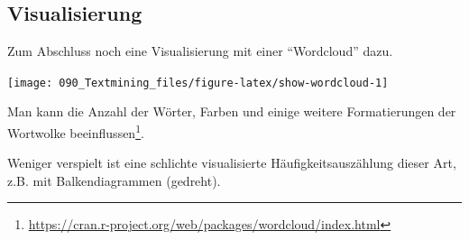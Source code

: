 \documentclass[12pt,ngerman,]{book}
\makeatletter
\newenvironment{Shaded}{\begin{snugshade}}{\end{snugshade}}
\newcommand{\KeywordTok}[1]{\textcolor[rgb]{0.13,0.29,0.53}{\textbf{#1}}}
\newcommand{\DataTypeTok}[1]{\textcolor[rgb]{0.13,0.29,0.53}{#1}}
\newcommand{\DecValTok}[1]{\textcolor[rgb]{0.00,0.00,0.81}{#1}}
\newcommand{\StringTok}[1]{\textcolor[rgb]{0.31,0.60,0.02}{#1}}
\newcommand{\OperatorTok}[1]{\textcolor[rgb]{0.81,0.36,0.00}{\textbf{#1}}}
\newcommand{\NormalTok}[1]{#1}
\let\rmarkdownfootnote\footnote%
\def\footnote{\protect\rmarkdownfootnote}
\newenvironment{kframe}{%
\medskip{}
\setlength{\fboxsep}{.8em}
 \def\at@end@of@kframe{}%
 \ifinner\ifhmode%
  \def\at@end@of@kframe{\end{minipage}}%
  \begin{minipage}{\columnwidth}%
 \fi\fi%
 \def\FrameCommand##1{\hskip\@totalleftmargin \hskip-\fboxsep
 \colorbox{shadecolor}{##1}\hskip-\fboxsep
     \hskip-\linewidth \hskip-\@totalleftmargin \hskip\columnwidth}%
 \MakeFramed {\advance\hsize-\width
   \@totalleftmargin\z@ \linewidth\hsize
   \@setminipage}}%
 {\par\unskip\endMakeFramed%
 \at@end@of@kframe}
\renewenvironment{Shaded}{\begin{kframe}}{\end{kframe}}
\theoremstyle{definition}
\theoremstyle{definition}
\theoremstyle{remark}
\makeatother
\begin{document}
\subsection{Visualisierung}\label{visualisierung}

Zum Abschluss noch eine Visualisierung mit einer ``Wordcloud'' dazu.

\begin{Shaded}
\end{Shaded}

\begin{Shaded}
\end{Shaded}

\begin{center}\texttt{[image: 090\_Textmining\_files/figure-latex/show-wordcloud-1]} \end{center}

Man kann die Anzahl der Wörter, Farben und einige weitere Formatierungen
der Wortwolke beeinflussen\footnote{\url{https://cran.r-project.org/web/packages/wordcloud/index.html}}.

Weniger verspielt ist eine schlichte visualisierte Häufigkeitsauszählung
dieser Art, z.B. mit Balkendiagrammen (gedreht).
\end{document}
